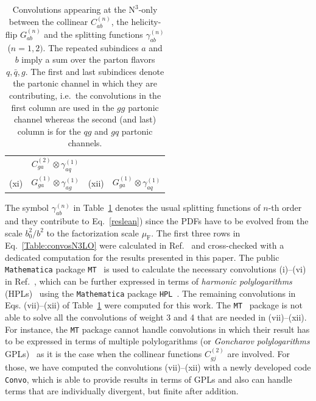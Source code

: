 \documentclass[12pt]{article}
\DeclareRobustCommand{\muf}{\ensuremath{\mu_{\mathrm{F}}}\xspace}
\DeclareRobustCommand{\muF}{\muf}
\DeclareRobustCommand{\LO}{\text{LO}\xspace}
\DeclareRobustCommand{\N}[1]{\ensuremath{\text{N}^{#1}}} %
\begin{document}
\begin{appendix}
\begin{table}
\begin{tabular}{ |c|c||c|c| }
& $C^{(2)}_{ga}\otimes\gamma^{(1)}_{aq}$  \\

\multirow{1}{*}{(xi)} 

& $G^{(1)}_{ga}\otimes\gamma^{(1)}_{ag}$

& \multirow{1}{*}{(xii)} 

& $G^{(1)}_{ga}\otimes\gamma^{(1)}_{aq}$  \\

\hline
\end{tabular}
\caption{\label{Table:convosN3LO}
{Convolutions appearing at the \N3\LO-only between the collinear $C^{(n)}_{ab}$, the helicity-flip $G^{(n)}_{ab}$ and the splitting functions $\gamma^{(n)}_{ab}$ ($n=1,2)$. The repeated subindices $a$ and $b$ imply a sum over the parton flavors $q,\bar{q},g$.  The first and last subindices denote the partonic channel in which they are contributing, i.e.\ the convolutions in the first column are used in the $gg$ partonic channel whereas the second (and last) column is for the $qg$ and $gq$ partonic channels.
}}
\renewcommand{\arraystretch}{1}
\end{table}

The symbol $\gamma_{ab}^{(n)}$ in Table~\ref{Table:convosN3LO} denotes the usual splitting functions of $n$-th order and they contribute to Eq.~\eqref{reslean}) since the PDFs have to be evolved from the scale $b_0^2/b^2$ to the factorization scale $\muF$.
The first three rows in Eq.~\eqref{Table:convosN3LO} were calculated in Ref.~\cite{Hoeschele:2012xc} and cross-checked with a dedicated computation for the results presented in this paper. The public \texttt{Mathematica} package \texttt{MT}~\cite{Hoeschele:2013gga} is used to calculate the necessary convolutions (i)--(vi) in Ref.~\cite{Hoeschele:2012xc}, which can be further expressed in terms of \textit{harmonic polylogarithms} (HPLs)~\cite{Remiddi:1999ew} using the \texttt{Mathematica} package \texttt{HPL}~\cite{Maitre:2005uu}. 
The remaining convolutions in Eqs. (vii)--(xii) of Table~\ref{Table:convosN3LO}  were computed  for this work. The \texttt{MT}~\cite{Hoeschele:2013gga} package is not able to solve all the convolutions of weight 3 and 4 that are needed in (vii)--(xii). For instance, the \texttt{MT} package cannot handle convolutions in which their result has to be expressed in terms of multiple polylogarithms (or \emph{Goncharov polylogarithms} GPLs)~\cite{Goncharov:1998kja,Gehrmann:2000zt,Goncharov:2001iea} as it is the case when the collinear functions $C^{(2)}_{gj}$ are involved. For those, we have computed the convolutions (vii)--(xii) with a newly developed code \texttt{Convo}, which is able to provide results in terms of GPLs and also can handle terms that are individually divergent, but finite after addition.


\end{appendix}
\end{document}
